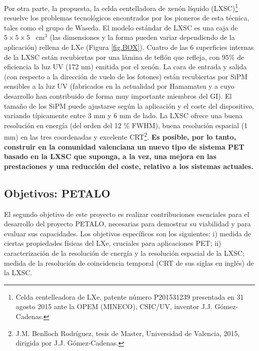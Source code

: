Por otra parte, la propuesta, la celda centelladora de xenón líquido (LXSC)\footnote{Celda centelleadora de LXe, patente número P201531239 presentada en 31 agosto 2015 ante la OPEM (MINECO), CSIC/UV, inventor J.J. Gómez-Cadenas.} resuelve los problemas tecnológicos encontrados por los pioneros de esta técnica, tales como el grupo de Waseda. El modelo estándar de LXSC es una caja de $5\times 5 \times 5$~ cm$^3$ (las dimensiones y la forma pueden variar dependiendo de la aplicación) rellena de LXe (Figura \ref{fig.BOX}). Cuatro de las 6 superficies internas de la LXSC están recubiertas por una lámina de teflón que refleja, con 95\% de eficiencia la luz UV (172 nm) emitida por el xenón. La cara de entrada y salida (con respecto a la dirección de vuelo de los fotones) están recubiertas por SiPM sensibles a la luz UV (fabricados en la actualidad por Hamamatsu y a cuyo desarrollo han contribuido de forma muy importante miembros del GI). El tamaño de los SiPM puede ajustarse según la aplicación y el coste del dispositivo, variando típicamente entre 3 mm y 6 mm de lado. La LXSC ofrece una buena resolución en energía (del orden del 12 \% FWHM), buena resolución espacial (1 mm) en las tres coordenadas y excelente CRT\footnote{J.M. Benlloch Rodríguez, tesis de Master, Universidad de Valencia, 2015, dirigida por J.J. Gómez-Cadenas. 
}. {\bf Es posible, por lo tanto, construir en la comunidad valenciana un nuevo tipo de sistema PET basado en la LXSC que suponga, a la vez, una mejora en las prestaciones y una reducción del coste, relativo a los sistemas actuales.}
\subsection*{Objetivos: PETALO}

El segundo objetivo de este proyecto es realizar contribuciones esenciales para el desarrollo del proyecto PETALO, necesarias para demostrar su viabilidad y para evaluar sus capacidades. Los objetivos específicos son los siguientes: i) medida de ciertas propiedades físicas del LXe, cruciales para aplicaciones PET;  ii) caracterización de la resolución de energía y la resolución espacial de la LXSC; medida de la resolución de coincidencia temporal (CRT de sus siglas en inglés) de la LXSC.

